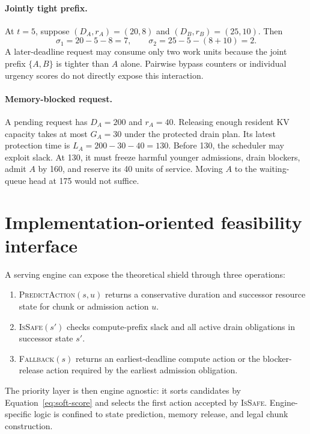 \documentclass{article}
\begin{document}
\paragraph{Jointly tight prefix.}
At $t=5$, suppose $(D_A,r_A)=(20,8)$ and $(D_B,r_B)=(25,10)$.  Then
\begin{equation}
    \sigma_1=20-5-8=7,
    \qquad
    \sigma_2=25-5-(8+10)=2.
\end{equation}
A later-deadline request may consume only two work units because the joint
prefix $\{A,B\}$ is tighter than $A$ alone.  Pairwise bypass counters or
individual urgency scores do not directly expose this interaction.

\paragraph{Memory-blocked request.}
A pending request has $D_A=200$ and $r_A=40$.  Releasing enough resident KV
capacity takes at most $G_A=30$ under the protected drain plan.  Its latest
protection time is $L_A=200-30-40=130$.  Before 130, the scheduler may exploit
slack.  At 130, it must freeze harmful younger admissions, drain blockers,
admit $A$ by 160, and reserve its 40 units of service.  Moving $A$ to the
waiting-queue head at 175 would not suffice.

\section{Implementation-oriented feasibility interface}
\label{app:interface}

A serving engine can expose the theoretical shield through three operations:
\begin{enumerate}
    \item \textsc{PredictAction}$(s,u)$ returns a conservative duration and
    successor resource state for chunk or admission action $u$.
    \item \textsc{IsSafe}$(s')$ checks compute-prefix slack and all active drain
    obligations in successor state $s'$.
    \item \textsc{Fallback}$(s)$ returns an earliest-deadline compute action or
    the blocker-release action required by the earliest admission obligation.
\end{enumerate}
The priority layer is then engine agnostic: it sorts candidates by
Equation~\eqref{eq:soft-score} and selects the first action accepted by
\textsc{IsSafe}.  Engine-specific logic is confined to state prediction,
memory release, and legal chunk construction.
\end{document}
